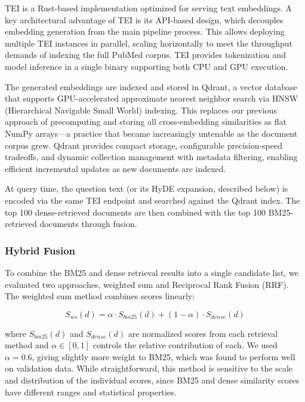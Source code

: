 TEI is a Rust-based implementation optimized for serving text embeddings. A key architectural advantage of TEI is its API-based design, which decouples embedding generation from the main pipeline process. This allows deploying multiple TEI instances in parallel, scaling horizontally to meet the throughput demands of indexing the full PubMed corpus. TEI provides tokenization and model inference in a single binary supporting both CPU and GPU execution.

The generated embeddings are indexed and stored in Qdrant, a vector database that supports GPU-accelerated approximate nearest neighbor search via HNSW (Hierarchical Navigable Small World) indexing. This replaces our previous approach of precomputing and storing all cross-embedding similarities as flat NumPy arrays---a practice that became increasingly untenable as the document corpus grew. Qdrant provides compact storage, configurable precision-speed tradeoffs, and dynamic collection management with metadata filtering, enabling efficient incremental updates as new documents are indexed.

At query time, the question text (or its HyDE expansion, described below) is encoded via the same TEI endpoint and searched against the Qdrant index. The top 100 dense-retrieved documents are then combined with the top 100 BM25-retrieved documents through fusion.

\subsubsection{Hybrid Fusion}

To combine the BM25 and dense retrieval results into a single candidate list, we evaluated two approaches, weighted sum and Reciprocal Rank Fusion (RRF). The weighted sum method combines scores linearly:

\begin{equation}
  S_{ws}(d) = \alpha \cdot S_{bm25}(d) + (1 - \alpha) \cdot S_{dense}(d)
\end{equation}

where $S_{bm25}(d)$ and $S_{dense}(d)$ are normalized scores from each retrieval method and $\alpha \in [0,1]$ controls the relative contribution of each. We used $\alpha = 0.6$, giving slightly more weight to BM25, which was found to perform well on validation data. While straightforward, this method is sensitive to the scale and distribution of the individual scores, since BM25 and dense similarity scores have different ranges and statistical properties.

